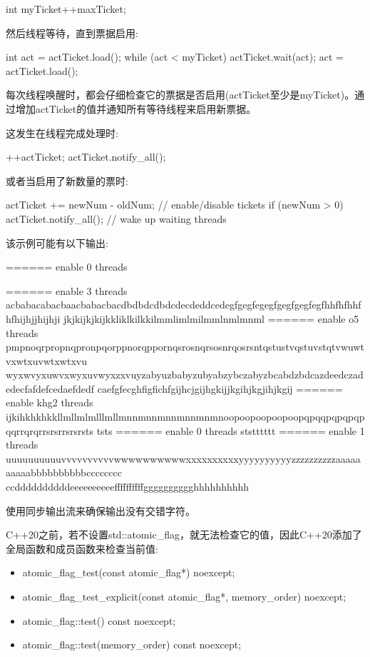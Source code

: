 \begin{cpp}
int myTicket{++maxTicket};
\end{cpp}

然后线程等待，直到票据启用:

\begin{cpp}
int act = actTicket.load();
while (act < myTicket) {
	actTicket.wait(act);
	act = actTicket.load();
}
\end{cpp}

每次线程唤醒时，都会仔细检查它的票据是否启用(actTicket至少是myTicket)。通过增加actTicket的值并通知所有等待线程来启用新票据。

这发生在线程完成处理时:

\begin{cpp}
++actTicket;
actTicket.notify_all();
\end{cpp}

或者当启用了新数量的票时:

\begin{cpp}
actTicket += newNum - oldNum; // enable/disable tickets
if (newNum > 0) actTicket.notify_all(); // wake up waiting threads
\end{cpp}

该示例可能有以下输出:

\begin{shell}
====== enable 0 threads

====== enable 3 threads
acbabacabacbaacbabacbacdbdbdcdbdcdecdeddcedegfgegfegegfgegfgegfegfhhfhfhhfhfhijhjjhijhji
jkjkijkjkijkkliklkilkkilmmlimlmilmmlnmlmnml
====== enable o5 threads
pmpnoqrpropnqpronpqorppnorqppornqsrosnqrsosnrqosrsntqstustvqstuvstqtvwuwtvxwtxuvwtxwtxvu
wyxwvyxuwvxwyxuvwyxzxvuyzabyuzbabyzubyabzybczabyzbcabdzbdcazdeedczadedecfafdefcedaefdedf
caefgfecghfigfichfgijhcjgijhgkijjkgihjkgjihjkgij
====== enable khg2 threads
ijkihkhkhkkllmllmlmlllmllmnnmnnmnnmnnmnmnoopoopoopoopoopqpqqpqpqpqpqqrrqrqrrsrsrrsrsrsts
tsts
====== enable 0 threads
ststttttt
====== enable 1 threads
uuuuuuuuuuvvvvvvvvvvwwwwwwwwwwxxxxxxxxxxyyyyyyyyyyzzzzzzzzzzaaaaaaaaaabbbbbbbbbbcccccccc
ccddddddddddeeeeeeeeeeffffffffffgggggggggghhhhhhhhhh
\end{shell}

使用同步输出流来确保输出没有交错字符。


C++20之前，若不设置std::atomic\_flag，就无法检查它的值，因此C++20添加了全局函数和成员函数来检查当前值:

\begin{itemize}
\item 
atomic\_flag\_test(const atomic\_flag*) noexcept;

\item 
atomic\_flag\_test\_explicit(const atomic\_flag*, memory\_order) noexcept;

\item 
atomic\_flag::test() const noexcept;

\item 
atomic\_flag::test(memory\_order) const noexcept;
\end{itemize}